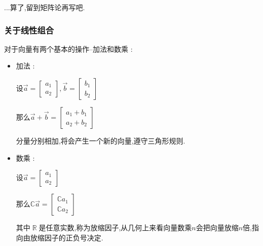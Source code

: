 \documentclass[UTF8,12pt]{ctexbook}
\newcommand{\mathConstant}{\mathbb{C}}
\DeclareMathOperator{\mathRealNumberCollection}{\mathbb{R}}
\begin{document}
{{{{{    ...算了,留到矩阵论再写吧.
  }%

  \subsubsection{关于线性组合}{
对于向量有两个基本的操作--加法和数乘 :

            \begin{itemize}
                \item {
                      加法 :

                      设$\vec{a} = \begin{bmatrix}
                              a_1 \\
                              a_2
                          \end{bmatrix},\vec{b} = \begin{bmatrix}
                              b_1 \\
                              b_2
                          \end{bmatrix}$

                      那么$\vec{a} + \vec{b} = \begin{bmatrix}
                              a_1 + b_1 \\
                              a_2 + b_2
                          \end{bmatrix}$

                      分量分别相加,将会产生一个新的向量,遵守三角形规则.
                      }
                \item {
                      数乘 :

                      设$\vec{a} = \begin{bmatrix}
                              a_1 \\
                              a_2
                          \end{bmatrix}$

                      那么$\mathConstant\vec{a} = \begin{bmatrix}
                              \mathConstant a_1 \\
                              \mathConstant a_2
                          \end{bmatrix}$

                      其中$\mathRealNumberCollection$是任意实数,称为放缩因子,从几何上来看向量数乘$n$会把向量放缩$n$倍,指向由放缩因子的正负号决定.
                      }
            \end{itemize}

}}}}}
\end{document}
